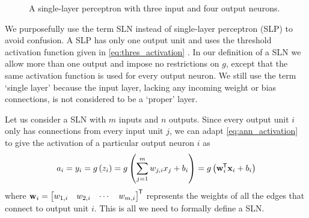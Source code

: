 \begin{figure}
    \begin{center}
    \end{center}
    \caption{A single-layer perceptron with three input and four output neurons.}
    \label{fig:single_layer_perceptron}
\end{figure}

We purposefully use the term SLN instead of single-layer perceptron (SLP) to avoid confusion. 
A SLP has only one output unit and uses the threshold activation function given in \ref{eq:thres_activation} \cite{rosenblatt1958}.
In our definition of a SLN we allow more than one output and impose no restrictions on $g$, except that the same activation function is used for every output neuron.
We still use the term `single layer' because the input layer, lacking any incoming weight or bias connections, is not considered to be a `proper' layer.

Let us consider a SLN with $m$ inputs and $n$ outputs. 
Since every output unit $i$ only has connections from every input unit $j$,
we can adapt \ref{eq:ann_activation} to give the activation of a particular output neuron $i$ as
\begin{equation}
    a_i = y_i = g\left(z_i\right) = g\left(\sum_{j=1}^m{w_{j,i} x_j} + b_i\right)
    = g\left( \mathbf{w}_i^{\mkern-1.5mu\mathsf{T}} \mathbf{x}_i + b_i\right)
\end{equation}
where
$
    \mathbf{w}_i = \begin{bmatrix}
        w_{1,i} & w_{2,i} & \cdots & w_{m,i}
    \end{bmatrix}^{\mkern-1.5mu\mathsf{T}}
$
represents the weights of all the edges that connect to output unit $i$.
This is all we need to formally define a SLN.


